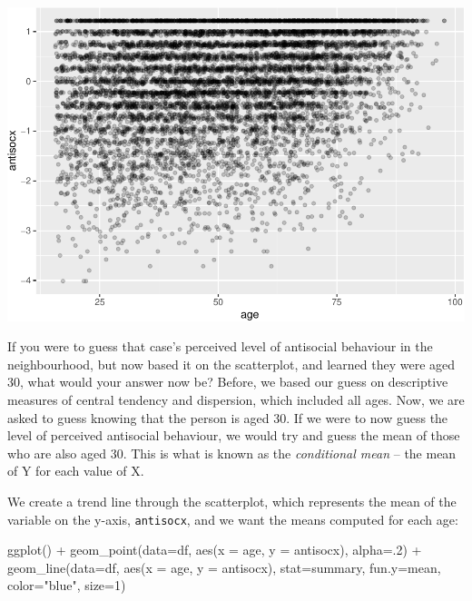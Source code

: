 \documentclass[
]{book}
\newenvironment{Shaded}{\begin{snugshade}}{\end{snugshade}}
\newcommand{\AttributeTok}[1]{\textcolor[rgb]{0.77,0.63,0.00}{#1}}
\newcommand{\DecValTok}[1]{\textcolor[rgb]{0.00,0.00,0.81}{#1}}
\newcommand{\FunctionTok}[1]{\textcolor[rgb]{0.00,0.00,0.00}{#1}}
\newcommand{\NormalTok}[1]{#1}
\newcommand{\SpecialCharTok}[1]{\textcolor[rgb]{0.00,0.00,0.00}{#1}}
\newcommand{\StringTok}[1]{\textcolor[rgb]{0.31,0.60,0.02}{#1}}
\begin{document}
\includegraphics{09-regression_files/figure-latex/unnamed-chunk-6-3.pdf}

If you were to guess that case's perceived level of antisocial behaviour in the neighbourhood, but now based it on the scatterplot, and learned they were aged 30, what would your answer now be? Before, we based our guess on descriptive measures of central tendency and dispersion, which included all ages. Now, we are asked to guess knowing that the person is aged 30. If we were to now guess the level of perceived antisocial behaviour, we would try and guess the mean of those who are also aged 30. This is what is known as the \emph{conditional mean} -- the mean of Y for each value of X.

We create a trend line through the scatterplot, which represents the mean of the variable on the y-axis, \texttt{antisocx}, and we want the means computed for each age:

\begin{Shaded}
\begin{Highlighting}[]
\FunctionTok{ggplot}\NormalTok{() }\SpecialCharTok{+} 
  \FunctionTok{geom\_point}\NormalTok{(}\AttributeTok{data=}\NormalTok{df, }\FunctionTok{aes}\NormalTok{(}\AttributeTok{x =}\NormalTok{ age, }\AttributeTok{y =}\NormalTok{ antisocx), }\AttributeTok{alpha=}\NormalTok{.}\DecValTok{2}\NormalTok{) }\SpecialCharTok{+} 
  \FunctionTok{geom\_line}\NormalTok{(}\AttributeTok{data=}\NormalTok{df, }\FunctionTok{aes}\NormalTok{(}\AttributeTok{x =}\NormalTok{ age, }\AttributeTok{y =}\NormalTok{ antisocx), }\AttributeTok{stat=}\StringTok{\textquotesingle{}summary\textquotesingle{}}\NormalTok{, }\AttributeTok{fun.y=}\NormalTok{mean,}
            \AttributeTok{color=}\StringTok{"blue"}\NormalTok{, }\AttributeTok{size=}\DecValTok{1}\NormalTok{)  }
\end{Highlighting}
\end{Shaded}
\end{document}
